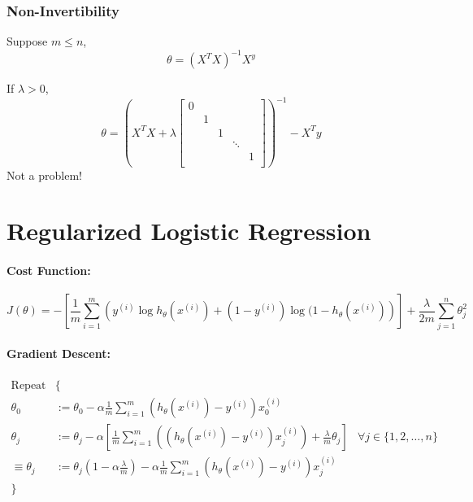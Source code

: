 \subsubsection*{Non-Invertibility}
Suppose $m \le n$,
$$\theta = \left(X^TX\right)^{-1}X^y$$

If $\lambda > 0$,
$$
    \theta = \left(
    X^TX + \lambda \begin{bmatrix}
        0 &   &   &        &   \\
          & 1 &   &        &   \\
          &   & 1 &        &   \\
          &   &   & \ddots &   \\
          &   &   &        & 1 \\
    \end{bmatrix}
    \right)^{-1} - X^Ty
$$
Not a problem!

\section{Regularized Logistic Regression}
\paragraph{Cost Function:}
\begin{equation*}
    J(\theta) = -\left[
        \frac{1}{m}\sum_{i=1}^m\left(
        y^{(i)}\log h_\theta(x^{(i)}) +
        (1 - y^{(i)})\log(1 - h_\theta(x^{(i)})
        \right)
        \right] + \frac{\lambda}{2m}\sum_{j=1}^n\theta_j^2
\end{equation*}

\paragraph{Gradient Descent:}
\begin{align*}
    \text{Repeat}   & \{                                                             \\
    \theta_0        & :=
    \theta_0 - \alpha \frac{1}{m} \sum_{i=1}^m(h_\theta(x^{(i)}) - y^{(i)})x_0^{(i)} \\
    \theta_j        & :=
    \theta_j - \alpha \left[
    \frac{1}{m} \sum_{i=1}^m\left(
    (h_\theta(x^{(i)}) - y^{(i)})x_j^{(i)}
    \right) + \frac{\lambda}{m}\theta_j
    \right]         & \forall j \in \{1, 2, \dots, n\}                               \\
    \equiv \theta_j & :=
    \theta_j(1 - \alpha\frac{\lambda}{m}) - \alpha\frac{1}{m}\sum_{i=1}^m(
    h_\theta(x^{(i)}) - y^{(i)}
    )x_j^{(i)}                                                                       \\
    \}
\end{align*}

